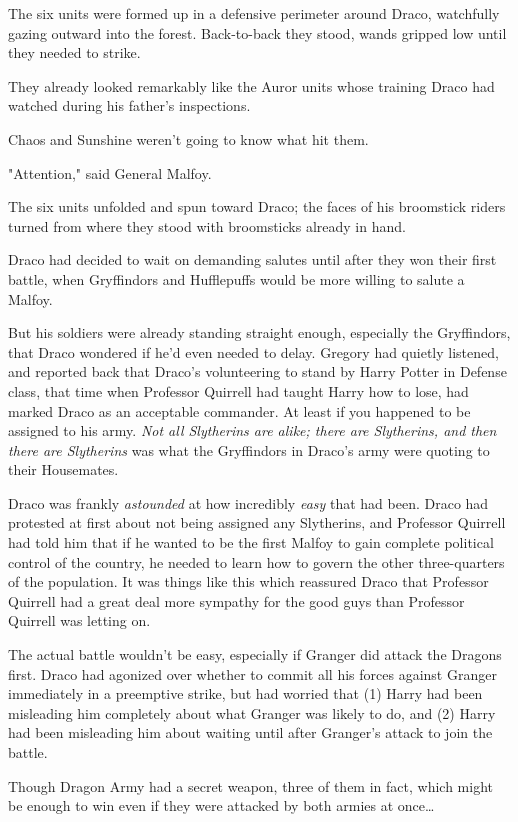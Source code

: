 The six units were formed up in a defensive perimeter around Draco, watchfully gazing outward into the forest. Back-to-back they stood, wands gripped low until they needed to strike.

They already looked remarkably like the Auror units whose training Draco had watched during his father's inspections.

Chaos and Sunshine weren't going to know what hit them.

"Attention," said General Malfoy.

The six units unfolded and spun toward Draco; the faces of his broomstick riders turned from where they stood with broomsticks already in hand.

Draco had decided to wait on demanding salutes until after they won their first battle, when Gryffindors and Hufflepuffs would be more willing to salute a Malfoy.

But his soldiers were already standing straight enough, especially the Gryffindors, that Draco wondered if he'd even needed to delay. Gregory had quietly listened, and reported back that Draco's volunteering to stand by Harry Potter in Defense class, that time when Professor Quirrell had taught Harry how to lose, had marked Draco as an acceptable commander. At least if you happened to be assigned to his army. \emph{Not all Slytherins are alike; there are Slytherins, and then there are Slytherins} was what the Gryffindors in Draco's army were quoting to their Housemates.

Draco was frankly \emph{astounded} at how incredibly \emph{easy} that had been. Draco had protested at first about not being assigned any Slytherins, and Professor Quirrell had told him that if he wanted to be the first Malfoy to gain complete political control of the country, he needed to learn how to govern the other three-quarters of the population. It was things like this which reassured Draco that Professor Quirrell had a great deal more sympathy for the good guys than Professor Quirrell was letting on.

The actual battle wouldn't be easy, especially if Granger did attack the Dragons first. Draco had agonized over whether to commit all his forces against Granger immediately in a preemptive strike, but had worried that (1) Harry had been misleading him completely about what Granger was likely to do, and (2) Harry had been misleading him about waiting until after Granger's attack to join the battle.

Though Dragon Army had a secret weapon, three of them in fact, which might be enough to win even if they were attacked by both armies at once{\ldots}

